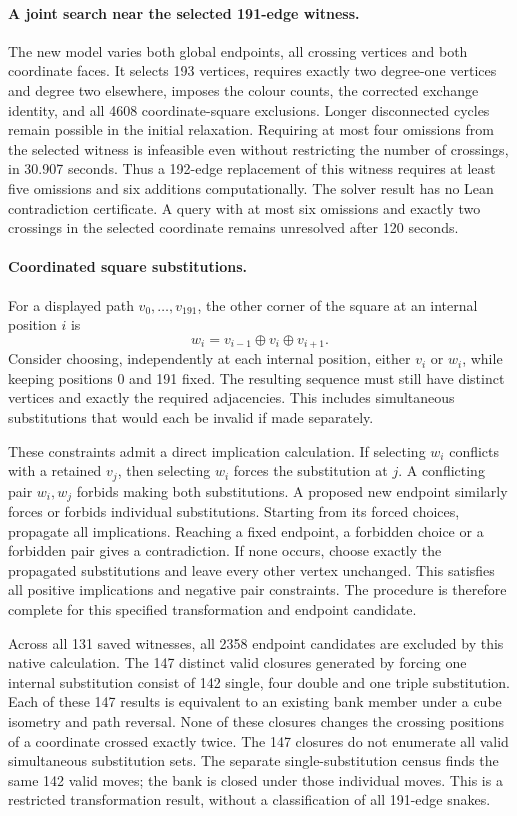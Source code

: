 \documentclass[11pt,a4paper]{article}
\theoremstyle{definition}
\theoremstyle{remark}
\begin{document}
\paragraph{A joint search near the selected 191-edge witness.}
The new model varies both global endpoints, all crossing vertices and
both coordinate faces. It selects 193 vertices, requires exactly two
degree-one vertices and degree two elsewhere, imposes the colour counts,
the corrected exchange identity, and all 4608 coordinate-square
exclusions. Longer disconnected cycles remain possible in the initial
relaxation. Requiring at most four omissions from the selected witness
is infeasible even without restricting the number of crossings, in
30.907 seconds. Thus a 192-edge replacement of this witness requires
at least five omissions and six additions computationally. The solver
result has no Lean contradiction certificate. A query with at most six
omissions and exactly two crossings in the selected coordinate remains
unresolved after 120 seconds.

\paragraph{Coordinated square substitutions.}
For a displayed path $v_0,\ldots,v_{191}$, the other corner of the square
at an internal position $i$ is
\[
w_i=v_{i-1}\oplus v_i\oplus v_{i+1}.
\]
Consider choosing, independently at each internal position, either
$v_i$ or $w_i$, while keeping positions 0 and 191 fixed. The resulting
sequence must still have distinct vertices and exactly the required
adjacencies. This includes simultaneous substitutions that would each
be invalid if made separately.

These constraints admit a direct implication calculation. If selecting
$w_i$ conflicts with a retained $v_j$, then selecting $w_i$ forces the
substitution at $j$. A conflicting pair $w_i,w_j$ forbids making both
substitutions. A proposed new endpoint similarly forces or forbids
individual substitutions. Starting from its forced choices, propagate
all implications. Reaching a fixed endpoint, a forbidden choice or a
forbidden pair gives a contradiction. If none occurs, choose exactly
the propagated substitutions and leave every other vertex unchanged.
This satisfies all positive implications and negative pair constraints.
The procedure is therefore complete for this specified transformation
and endpoint candidate.

Across all 131 saved witnesses, all 2358 endpoint candidates are
excluded by this native calculation. The 147 distinct valid closures
generated by forcing one internal substitution consist of 142 single,
four double and one triple substitution. Each of these 147 results is
equivalent to an existing bank member under a cube isometry and path
reversal. None of these closures changes the crossing positions of a
coordinate crossed exactly twice. The 147 closures do not enumerate
all valid simultaneous substitution sets. The separate single-substitution
census finds the same 142 valid moves; the bank is closed under those
individual moves. This is a restricted transformation result, without
a classification of all 191-edge snakes.
\end{document}
